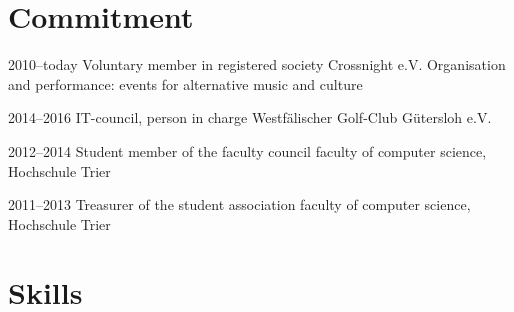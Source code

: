 \documentclass[]{friggeri-cv} %
\begin{document}
\pagebreak


\section{Commitment}

\begin{entrylist}
	
	
	\entry
	{2010--today}
	{Voluntary member in registered society Crossnight e.V.}
	{}
	{Organisation and performance: events for alternative music and culture}
	
	\entry
	{2014--2016}
	{IT-council, person in charge}
	{}
	{Westf\"{a}lischer Golf-Club G\"{u}tersloh e.V.}
	
	
	
	\entry
	{2012--2014}
	{Student member of the faculty council}
	{}
	{faculty of computer science, Hochschule Trier}
	
	
	\entry
	{2011--2013}
	{Treasurer of the student association}
	{}
	{faculty of computer science, Hochschule Trier}
	
	
	
\end{entrylist}


\section{Skills}
\end{document}
